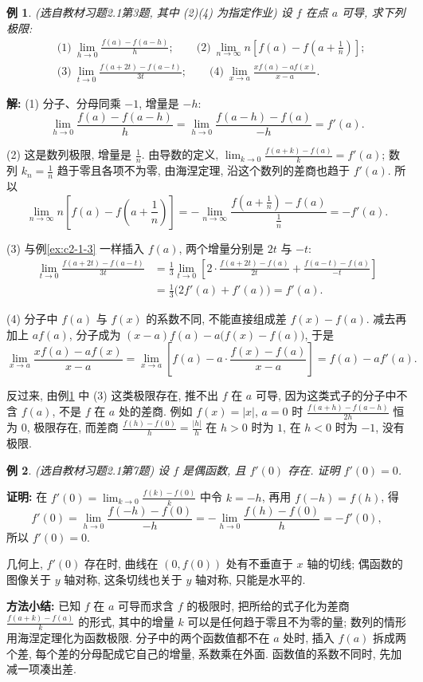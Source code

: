 \documentclass[UTF8,openany]{ctexbook}
\theoremstyle{chinesetextbook}
\newtheorem{example}{例}[section]
\newenvironment{cnproof}{\par\indent\textbf{证明:} \ignorespaces}{\par}
\newenvironment{cnsolution}{\par\indent\textbf{解:} \ignorespaces}{\par}
\begin{document}
\begin{example}\label{ex:c2-h1-3}
\textnormal{(选自教材习题2.1第3题, 其中 (2)(4) 为指定作业)} 设 $f$ 在点 $a$ 可导, 求下列极限:
\[
\begin{aligned}
&\text{(1)}\ \lim_{h\to0}\frac{f(a)-f(a-h)}h;\qquad\text{(2)}\ \lim_{n\to\infty}n\left[f(a)-f\left(a+\frac1n\right)\right];\\
&\text{(3)}\ \lim_{t\to0}\frac{f(a+2t)-f(a-t)}{3t};\qquad\text{(4)}\ \lim_{x\to a}\frac{xf(a)-af(x)}{x-a}.
\end{aligned}
\]
\end{example}
\begin{cnsolution}
(1) 分子、分母同乘 $-1$, 增量是 $-h$:
\[
\lim_{h\to0}\frac{f(a)-f(a-h)}h=\lim_{h\to0}\frac{f(a-h)-f(a)}{-h}=f'(a).
\]

(2) 这是数列极限, 增量是 $\displaystyle\frac1n$. 由导数的定义, $\displaystyle\lim_{k\to0}\frac{f(a+k)-f(a)}k=f'(a)$; 数列 $\displaystyle k_n=\frac1n$ 趋于零且各项不为零, 由海涅定理, 沿这个数列的差商也趋于 $f'(a)$. 所以
\[
\lim_{n\to\infty}n\left[f(a)-f\left(a+\frac1n\right)\right]=-\lim_{n\to\infty}\frac{f\left(a+\frac1n\right)-f(a)}{\frac1n}=-f'(a).
\]

(3) 与例\ref{ex:c2-1-3} 一样插入 $f(a)$, 两个增量分别是 $2t$ 与 $-t$:
\[
\begin{aligned}
\lim_{t\to0}\frac{f(a+2t)-f(a-t)}{3t}&=\frac13\lim_{t\to0}\left[2\cdot\frac{f(a+2t)-f(a)}{2t}+\frac{f(a-t)-f(a)}{-t}\right]\\
&=\frac13\bigl(2f'(a)+f'(a)\bigr)=f'(a).
\end{aligned}
\]

(4) 分子中 $f(a)$ 与 $f(x)$ 的系数不同, 不能直接组成差 $f(x)-f(a)$. 减去再加上 $af(a)$, 分子成为 $(x-a)f(a)-a\bigl(f(x)-f(a)\bigr)$, 于是
\[
\lim_{x\to a}\frac{xf(a)-af(x)}{x-a}=\lim_{x\to a}\left[f(a)-a\cdot\frac{f(x)-f(a)}{x-a}\right]=f(a)-af'(a).
\]
\end{cnsolution}
反过来, 由例\ref{ex:c2-h1-3} 中 (3) 这类极限存在, 推不出 $f$ 在 $a$ 可导, 因为这类式子的分子中不含 $f(a)$, 不是 $f$ 在 $a$ 处的差商. 例如 $f(x)=|x|$, $a=0$ 时 $\displaystyle\frac{f(a+h)-f(a-h)}{2h}$ 恒为 $0$, 极限存在, 而差商 $\displaystyle\frac{f(h)-f(0)}h=\frac{|h|}h$ 在 $h>0$ 时为 $1$, 在 $h<0$ 时为 $-1$, 没有极限.
\begin{example}\label{ex:c2-h1-7}
\textnormal{(选自教材习题2.1第7题)} 设 $f$ 是偶函数, 且 $f'(0)$ 存在. 证明 $f'(0)=0$.
\end{example}
\begin{cnproof}
在 $\displaystyle f'(0)=\lim_{k\to0}\frac{f(k)-f(0)}k$ 中令 $k=-h$, 再用 $f(-h)=f(h)$, 得
\[
f'(0)=\lim_{h\to0}\frac{f(-h)-f(0)}{-h}=-\lim_{h\to0}\frac{f(h)-f(0)}h=-f'(0),
\]
所以 $f'(0)=0$.
\end{cnproof}
几何上, $f'(0)$ 存在时, 曲线在 $(0,f(0))$ 处有不垂直于 $x$ 轴的切线; 偶函数的图像关于 $y$ 轴对称, 这条切线也关于 $y$ 轴对称, 只能是水平的.
\par\indent\textbf{方法小结:} 已知 $f$ 在 $a$ 可导而求含 $f$ 的极限时, 把所给的式子化为差商 $\displaystyle\frac{f(a+k)-f(a)}k$ 的形式, 其中的增量 $k$ 可以是任何趋于零且不为零的量; 数列的情形用海涅定理化为函数极限. 分子中的两个函数值都不在 $a$ 处时, 插入 $f(a)$ 拆成两个差, 每个差的分母配成它自己的增量, 系数乘在外面. 函数值的系数不同时, 先加减一项凑出差.
\end{document}
